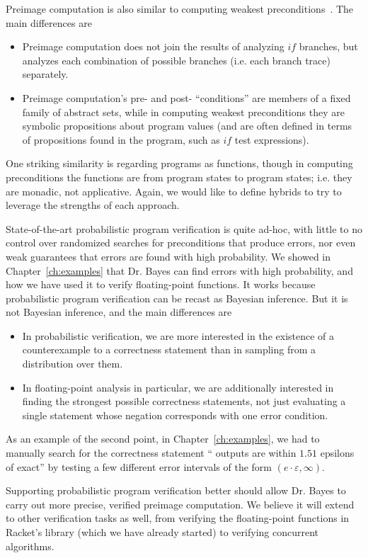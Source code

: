 Preimage computation is also similar to computing weakest preconditions~\cite{cit:dijkstra-1975-preconditions}.
The main differences are
\begin{itemize}
	\item Preimage computation does not join the results of analyzing $if$ branches, but analyzes each combination of possible branches (i.e. each branch trace) separately.
	\item Preimage computation's pre- and post- ``conditions'' are members of a fixed family of abstract sets, while in computing weakest preconditions they are symbolic propositions about program values (and are often defined in terms of propositions found in the program, such as $if$ test expressions).
\end{itemize}
One striking similarity is regarding programs as functions, though in computing preconditions the functions are from program states to program states; i.e. they are monadic, not applicative.
Again, we would like to define hybrids to try to leverage the strengths of each approach.

State-of-the-art probabilistic program verification is quite ad-hoc, with little to no control over randomized searches for preconditions that produce errors, nor even weak guarantees that errors are found with high probability.
We showed in Chapter~\ref{ch:examples} that Dr. Bayes can find errors with high probability, and how we have used it to verify floating-point functions.
It works because probabilistic program verification can be recast as Bayesian inference.
But it is not Bayesian inference, and the main differences are
\begin{itemize}
	\item In probabilistic verification, we are more interested in the existence of a counterexample to a correctness statement than in sampling from a distribution over them.
	\item In floating-point analysis in particular, we are additionally interested in finding the strongest possible correctness statements, not just evaluating a single statement whose negation corresponds with one error condition.
\end{itemize}
As an example of the second point, in Chapter~\ref{ch:examples}, we had to manually search for the correctness statement `` outputs are within $1.51$ epsilons of exact'' by testing a few different error intervals of the form $(e \cdot \varepsilon,\infty)$.

Supporting probabilistic program verification better should allow Dr. Bayes to carry out more precise, verified preimage computation.
We believe it will extend to other verification tasks as well, from verifying the floating-point functions in Racket's  library (which we have already started) to verifying concurrent algorithms.

